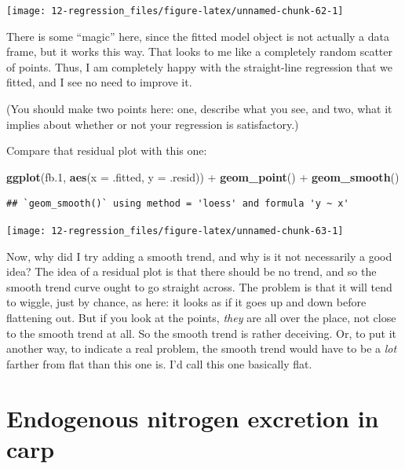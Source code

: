 \documentclass[]{tufte-book}
\newenvironment{Shaded}{}{}
\newcommand{\DataTypeTok}[1]{\textcolor[rgb]{0.56,0.13,0.00}{#1}}
\newcommand{\FloatTok}[1]{\textcolor[rgb]{0.25,0.63,0.44}{#1}}
\newcommand{\KeywordTok}[1]{\textcolor[rgb]{0.00,0.44,0.13}{\textbf{#1}}}
\newcommand{\NormalTok}[1]{#1}
\newcommand{\OperatorTok}[1]{\textcolor[rgb]{0.40,0.40,0.40}{#1}}
\newcommand{\StringTok}[1]{\textcolor[rgb]{0.25,0.44,0.63}{#1}}
\theoremstyle{definition}
\theoremstyle{definition}
\theoremstyle{definition}
\theoremstyle{remark}
\begin{document}
\texttt{[image: 12-regression\_files/figure-latex/unnamed-chunk-62-1]}

There is some ``magic'' here, since the fitted model object is not
actually a data frame, but it works this way. That looks to me like a
completely random scatter of points. Thus, I am completely happy with
the straight-line regression that we fitted, and I see no need to
improve it.

(You should make two points here: one, describe what you see, and two,
what it implies about whether or not your regression is satisfactory.)

Compare that residual plot with this one:

\begin{Shaded}
\begin{Highlighting}[]
\KeywordTok{ggplot}\NormalTok{(fb}\FloatTok{.1}\NormalTok{, }\KeywordTok{aes}\NormalTok{(}\DataTypeTok{x =}\NormalTok{ .fitted, }\DataTypeTok{y =}\NormalTok{ .resid)) }\OperatorTok{+}\StringTok{ }\KeywordTok{geom_point}\NormalTok{() }\OperatorTok{+}\StringTok{ }
\StringTok{    }\KeywordTok{geom_smooth}\NormalTok{()}
\end{Highlighting}
\end{Shaded}

\begin{verbatim}
## `geom_smooth()` using method = 'loess' and formula 'y ~ x'
\end{verbatim}

\texttt{[image: 12-regression\_files/figure-latex/unnamed-chunk-63-1]}

Now, why did I try adding a smooth trend, and why is it not necessarily
a good idea? The idea of a residual plot is that there should be no
trend, and so the smooth trend curve ought to go straight across. The
problem is that it will tend to wiggle, just by chance, as here: it
looks as if it goes up and down before flattening out. But if you look
at the points, \emph{they} are all over the place, not close to the
smooth trend at all. So the smooth trend is rather deceiving. Or, to put
it another way, to indicate a real problem, the smooth trend would have
to be a \emph{lot} farther from flat than this one is. I'd call this one
basically flat.

\hypertarget{endogenous-nitrogen-excretion-in-carp}{%
\section{Endogenous nitrogen excretion in
carp}\label{endogenous-nitrogen-excretion-in-carp}}
\end{document}
